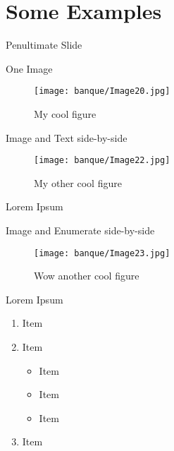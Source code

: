\documentclass[aspectratio=169]{laplace-beamer}
\begin{document}
\section{Some Examples}
\begin{frame}[default]{Penultimate Slide}
\end{frame}

\begin{frame}{One Image}
\begin{figure}[ht]
  \centering
  \texttt{[image: banque/Image20.jpg]}
  \caption{My cool figure}
\end{figure}
\end{frame}

\begin{frame}{Image and Text side-by-side}
  \begin{minipage}[c]{0.45\textwidth}
    \begin{figure}[ht]
      \centering
      \texttt{[image: banque/Image22.jpg]}
      \caption{My other cool figure}
    \end{figure}
  \end{minipage}
  \hfill
  \begin{minipage}[c]{0.45\textwidth}
    \begin{block}{Lorem Ipsum}
      \lipsum[1][1-6]
    \end{block}
  \end{minipage}
\end{frame}

\begin{frame}{Image and Enumerate side-by-side}
  \begin{minipage}[c]{0.45\textwidth}
    \begin{figure}[ht]
      \centering
      \texttt{[image: banque/Image23.jpg]}
      \caption{Wow another cool figure}
    \end{figure}
  \end{minipage}
  \hfill
  \begin{minipage}[c]{0.45\textwidth}
    \begin{block}{Lorem Ipsum}
      \begin{enumerate}
        \item Item
        \item Item
              \begin{itemize}
                \item Item
                \item Item
                \item Item
              \end{itemize}
        \item Item
      \end{enumerate}
    \end{block}
  \end{minipage}
\end{frame}
\end{document}
